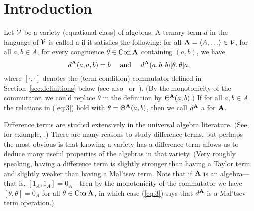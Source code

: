 \newtheorem{thm}{Theorem}[section]
\newtheorem{lem}[thm]{Lemma}
\newtheorem{cor}[thm]{Corollary}

\newtheorem{rem}[thm]{Remark}
\newtheorem{prob}{Problem}





\section{Introduction}
\label{sec:introduction}
Let $\mathcal{V}$ be a variety (equational class) of algebras.
A ternary term $d$ in the language of $\mathcal{V}$ is called 
a  if it satisfies the following:
for all $\bA = \<A, \dots \> \in \sV$, for all $a, b \in A$, for every 
congruence $\theta\in \operatorname{Con}\mathbf{A}$ containing $(a,b)$, we have
\begin{equation}
\label{eq:3}  
d^{\bA}(a,a,b) = b \quad \text{ and } \quad
d^{\bA}(a,b,b) \comm \theta \theta a,
\end{equation}
where $[\cdot, \cdot]$ denotes the (term condition) commutator
defined in Section~\ref{sec:definitions} below
(see also~\cite{HM:1988} or~\cite{MR3076179}).
(By the monotonicity of the commutator, we could replace $\theta$ in the
definition by $\Theta^{\mathbf{A}}(a,b)$.)
If for all $a, b \in A$ the relations in (\ref{eq:3}) hold 
with $\theta = \Theta^{\mathbf{A}}(a,b)$, then we call
$d^{\mathbf{A}}$ a  for $\mathbf{A}$.

Difference terms are studied extensively in the universal algebra literature.
(See, for example, \cite{HM:1988,KSW,MR3449235,MR1358491,MR3076179,MR1663558}.)
There are many reasons to study difference terms, but
perhaps the most obvious is that knowing a variety 
has a difference term allows us to deduce many useful
properties of the algebras in that variety.
(Very roughly speaking, having a difference term is slightly stronger than having
a Taylor term and slightly weaker than having a Mal'tsev term.
Note that if
$\mathbf{A}$ is an  algebra---that is, $[1_A, 1_A] = 0_A$---then by
the monotonicity of the commutator we have
$[\theta, \theta] = 0_A$ for all $\theta \in \operatorname{Con} \mathbf{A}$, in which case
(\ref{eq:3}) says that $d^{\mathbf{A}}$ is a Mal'tsev term operation.)

